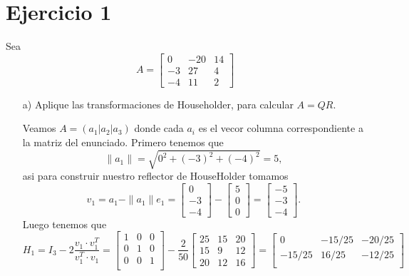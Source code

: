 
\section*{Ejercicio 1}
Sea
\[
A = \begin{bmatrix} 0 & -20 & 14 \\ -3 & 27 & 4 \\ -4 & 11 & 2 \end{bmatrix}
\]
\begin{enumerate}
    \item[a)] Aplique las transformaciones de Householder, para calcular $A = QR$.
    \begin{solution}
        Veamos $A=(a_1|a_2|a_3)$ donde cada $a_i$ es el vecor columna correspondiente a la matriz del enunciado. Primero tenemos que
        $$\|a_1\|=\sqrt{0^2+(-3)^2+(-4)^2}=5,$$ 
        asi para construir nuestro reflector de HouseHolder tomamos
        $$v_1=a_1-\|a_1\|e_1=\begin{bmatrix}
            0\\-3\\-4
        \end{bmatrix}-\begin{bmatrix}
                5\\ 0\\0
            \end{bmatrix}=\begin{bmatrix}
                -5\\-3\\-4
            \end{bmatrix}.$$
            Luego tenemos que
            $$H_1=I_3-2\frac{v_1\cdot v_1^T}{v_1^T\cdot v_1}=\begin{bmatrix}
                1&0&0\\
                0&1&0\\
                0&0&1\\
            \end{bmatrix}-\frac{2}{50}\begin{bmatrix}
                25&15&20\\
                15&9&12\\
                20&12&16 
            \end{bmatrix}=\begin{bmatrix}
                0&-15/25&-20/25\\
                -15/25&16/25&-12/25\\

\end{bmatrix}$$
\end{solution}
\end{enumerate}
